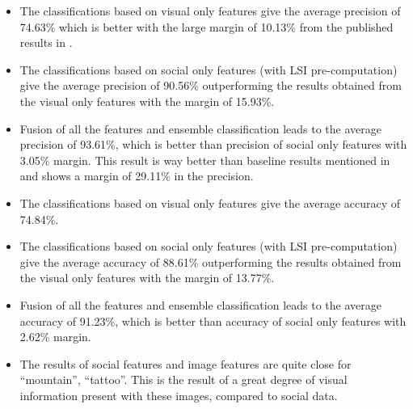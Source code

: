 \begin{itemize}
\item The classifications based on visual only features give the average precision of 74.63\% which is better with the large margin of 10.13\% from the published results in \cite{NUS}.

\item The classifications based on social only features (with LSI pre-computation) give the average precision of 90.56\% outperforming the results obtained from the visual only features with the margin of 15.93\%.

\item Fusion of all the features and ensemble classification leads to the average precision of 93.61\%, which  is better than precision of social only features with 3.05\% margin. This result is way better than baseline results mentioned in \cite{NUS} and shows a margin of 29.11\% in the precision.

\item The classifications based on visual only features give the average accuracy of 74.84\%.

\item The classifications based on social only features (with LSI pre-computation) give the average accuracy of 88.61\% outperforming the results obtained from the visual only features with the margin of 13.77\%.

\item Fusion of all the features and ensemble classification leads to the average accuracy of 91.23\%, which is better than accuracy of social only features with 2.62\% margin. 

\item The results of social features and image features are quite close for “mountain”, “tattoo”. This is the result of a great degree of visual information present with these images, compared to social data.
\end{itemize}


